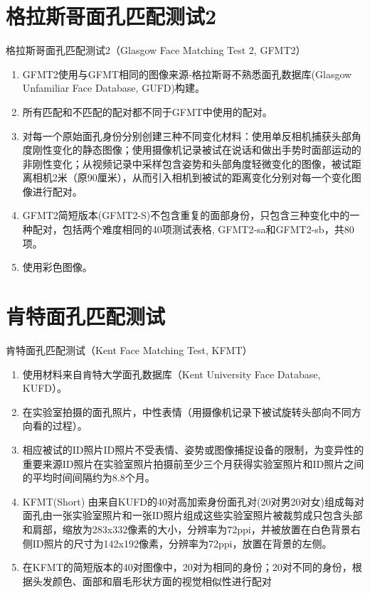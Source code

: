 \documentclass[]{ctexbook}
\providecommand{\tightlist}{%
  \setlength{\itemsep}{0pt}\setlength{\parskip}{0pt}}
\theoremstyle{definition}
\theoremstyle{definition}
\theoremstyle{definition}
\theoremstyle{definition}
\theoremstyle{remark}
\begin{document}
\section{格拉斯哥面孔匹配测试2}\label{ux683cux62c9ux65afux54e5ux9762ux5b54ux5339ux914dux6d4bux8bd52}

格拉斯哥面孔匹配测试2（Glasgow Face Matching Test 2, GFMT2）

\begin{enumerate}
\def\labelenumi{\arabic{enumi}.}
\tightlist
\item
  GFMT2使用与GFMT相同的图像来源-格拉斯哥不熟悉面孔数据库(Glasgow Unfamiliar Face Database, GUFD)构建。\\
\item
  所有匹配和不匹配的配对都不同于GFMT中使用的配对。\\
\item
  对每一个原始面孔身份分别创建三种不同变化材料：使用单反相机捕获头部角度刚性变化的静态图像；使用摄像机记录被试在说话和做出手势时面部运动的非刚性变化；从视频记录中采样包含姿势和头部角度轻微变化的图像，被试距离相机2米（原90厘米），从而引入相机到被试的距离变化分别对每一个变化图像进行配对。\\
\item
  GFMT2简短版本(GFMT2-S)不包含重复的面部身份，只包含三种变化中的一种配对，包括两个难度相同的40项测试表格, GFMT2-sa和GFMT2-sb，共80项。\\
\item
  使用彩色图像。
\end{enumerate}

\section{肯特面孔匹配测试}\label{ux80afux7279ux9762ux5b54ux5339ux914dux6d4bux8bd5}

肯特面孔匹配测试（Kent Face Matching Test, KFMT）

\begin{enumerate}
\def\labelenumi{\arabic{enumi}.}
\tightlist
\item
  使用材料来自肯特大学面孔数据库（Kent University Face Database, KUFD）。\\
\item
  在实验室拍摄的面孔照片，中性表情（用摄像机记录下被试旋转头部向不同方向看的过程）。\\
\item
  相应被试的ID照片ID照片不受表情、姿势或图像捕捉设备的限制，为变异性的重要来源ID照片在实验室照片拍摄前至少三个月获得实验室照片和ID照片之间的平均时间间隔约为8.8个月。\\
\item
  KFMT(Short) 由来自KUFD的40对高加索身份面孔对(20对男20对女)组成每对面孔由一张实验室照片和一张ID照片组成这些实验室照片被裁剪成只包含头部和肩部，缩放为283x332像素的大小，分辨率为72ppi，并被放置在白色背景右侧ID照片的尺寸为142x192像素，分辨率为72ppi，放置在背景的左侧。\\
\item
  在KFMT的简短版本的40对图像中，20对为相同的身份；20对不同的身份，根据头发颜色、面部和眉毛形状方面的视觉相似性进行配对
\end{enumerate}
\end{document}
